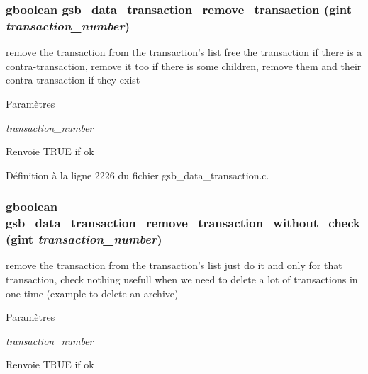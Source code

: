\subsubsection[{gsb\_\-data\_\-transaction\_\-remove\_\-transaction}]{\setlength{\rightskip}{0pt plus 5cm}gboolean gsb\_\-data\_\-transaction\_\-remove\_\-transaction (gint {\em transaction\_\-number})}\label{gsb__data__transaction_8c_aef8db2326b8eb8bce54ee20df4f49c1e}
remove the transaction from the transaction's list free the transaction if there is a contra-\/transaction, remove it too if there is some children, remove them and their contra-\/transaction if they exist


\begin{DoxyParams}{Paramètres}
\item[{\em transaction\_\-number}]\end{DoxyParams}
\begin{DoxyReturn}{Renvoie}
TRUE if ok 
\end{DoxyReturn}


Définition à la ligne 2226 du fichier gsb\_\-data\_\-transaction.c.

\subsubsection[{gsb\_\-data\_\-transaction\_\-remove\_\-transaction\_\-without\_\-check}]{\setlength{\rightskip}{0pt plus 5cm}gboolean gsb\_\-data\_\-transaction\_\-remove\_\-transaction\_\-without\_\-check (gint {\em transaction\_\-number})}\label{gsb__data__transaction_8c_a29e77fb492430ce1ddc9fad9ba9dab96}
remove the transaction from the transaction's list just do it and only for that transaction, check nothing usefull when we need to delete a lot of transactions in one time (example to delete an archive)


\begin{DoxyParams}{Paramètres}
\item[{\em transaction\_\-number}]\end{DoxyParams}
\begin{DoxyReturn}{Renvoie}
TRUE if ok 
\end{DoxyReturn}


